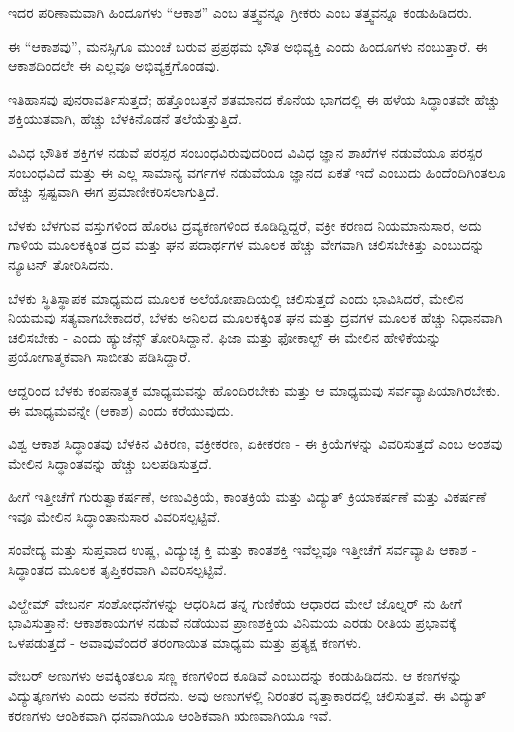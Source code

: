 ಇದರ ಪರಿಣಾಮವಾಗಿ ಹಿಂದೂಗಳು “ಆಕಾಶ” ಎಂಬ ತತ್ತ್ವವನ್ನೂ ಗ್ರೀಕರು  ಎಂಬ ತತ್ತ್ವವನ್ನೂ ಕಂಡುಹಿಡಿದರು.

ಈ “ಆಕಾಶವು”, ಮನಸ್ಸಿಗೂ ಮುಂಚೆ ಬರುವ ಪ್ರಪ್ರಥಮ ಭೌತ ಅಭಿವ್ಯಕ್ತಿ ಎಂದು ಹಿಂದೂಗಳು ನಂಬುತ್ತಾರೆ. ಈ ಆಕಾಶದಿಂದಲೇ ಈ ಎಲ್ಲವೂ ಅಭಿವ್ಯಕ್ತಗೊಂಡವು.

ಇತಿಹಾಸವು ಪುನರಾವರ್ತಿಸುತ್ತದೆ; ಹತ್ತೊಂಬತ್ತನೆ ಶತಮಾನದ ಕೊನೆಯ ಭಾಗದಲ್ಲಿ ಈ ಹಳೆಯ ಸಿದ್ಧಾಂತವೇ ಹೆಚ್ಚು ಶಕ್ತಿಯುತವಾಗಿ, ಹೆಚ್ಚು ಬೆಳಕಿನೊಡನೆ ತಲೆಯೆತ್ತುತ್ತಿದೆ.

ವಿವಿಧ ಭೌತಿಕ ಶಕ್ತಿಗಳ ನಡುವೆ ಪರಸ್ಪರ ಸಂಬಂಧವಿರುವುದರಿಂದ ವಿವಿಧ ಜ್ಞಾನ ಶಾಖೆಗಳ ನಡುವೆಯೂ ಪರಸ್ಪರ ಸಂಬಂಧವಿದೆ ಮತ್ತು ಈ ಎಲ್ಲ ಸಾಮಾನ್ಯ ವರ್ಗಗಳ ನಡುವೆಯೂ ಜ್ಞಾನದ ಏಕತೆ ಇದೆ ಎಂಬುದು ಹಿಂದೆಂದಿಗಿಂತಲೂ ಹೆಚ್ಚು ಸ್ಪಷ್ಟವಾಗಿ ಈಗ ಪ್ರಮಾಣೀಕರಿಸಲಾಗುತ್ತಿದೆ.

ಬೆಳಕು ಬೆಳಗುವ ವಸ್ತುಗಳಿಂದ ಹೊರಟ ದ್ರವ್ಯಕಣಗಳಿಂದ ಕೂಡಿದ್ದಿದ್ದರೆ, ವಕ್ರೀ ಕರಣದ ನಿಯಮಾನುಸಾರ, ಅದು ಗಾಳಿಯ ಮೂಲಕಕ್ಕಿಂತ ದ್ರವ ಮತ್ತು ಘನ ಪದಾರ್ಥಗಳ ಮೂಲಕ ಹೆಚ್ಚು ವೇಗವಾಗಿ ಚಲಿಸಬೇಕಿತ್ತು ಎಂಬುದನ್ನು ನ್ಯೂಟನ್ ತೋರಿಸಿದನು.

ಬೆಳಕು ಸ್ಥಿತಿಸ್ಥಾಪಕ ಮಾಧ್ಯಮದ ಮೂಲಕ ಅಲೆಯೋಪಾದಿಯಲ್ಲಿ ಚಲಿಸುತ್ತದೆ ಎಂದು ಭಾವಿಸಿದರೆ, ಮೇಲಿನ ನಿಯಮವು ಸತ್ಯವಾಗಬೇಕಾದರೆ, ಬೆಳಕು ಅನಿಲದ ಮೂಲಕಕ್ಕಿಂತ ಘನ ಮತ್ತು ದ್ರವಗಳ ಮೂಲಕ ಹೆಚ್ಚು ನಿಧಾನವಾಗಿ ಚಲಿಸಬೇಕು - ಎಂದು ಹ್ಯುಜೆನ್ಸ್  ತೋರಿಸಿದ್ದಾನೆ. ಫಿಜಾ  ಮತ್ತು ಫೋಕಾಲ್ಟ್  ಈ ಮೇಲಿನ ಹೇಳಿಕೆಯನ್ನು ಪ್ರಯೋಗಾತ್ಮಕವಾಗಿ ಸಾಬೀತು ಪಡಿಸಿದ್ದಾರೆ.

ಆದ್ದರಿಂದ ಬೆಳಕು ಕಂಪನಾತ್ಮಕ ಮಾಧ್ಯಮವನ್ನು ಹೊಂದಿರಬೇಕು ಮತ್ತು ಆ ಮಾಧ್ಯಮವು ಸರ್ವವ್ಯಾಪಿಯಾಗಿರಬೇಕು. ಈ ಮಾಧ್ಯಮವನ್ನೇ  (ಆಕಾಶ) ಎಂದು ಕರೆಯುವುದು.

ವಿಶ್ವ ಆಕಾಶ ಸಿದ್ಧಾಂತವು ಬೆಳಕಿನ ವಿಕಿರಣ, ವಕ್ರೀಕರಣ, ಏಕೀಕರಣ - ಈ ಕ್ರಿಯೆಗಳನ್ನು ವಿವರಿಸುತ್ತದೆ ಎಂಬ ಅಂಶವು ಮೇಲಿನ ಸಿದ್ಧಾಂತವನ್ನು ಹೆಚ್ಚು ಬಲಪಡಿಸುತ್ತದೆ.

ಹೀಗೆ ಇತ್ತೀಚೆಗೆ ಗುರುತ್ವಾಕರ್ಷಣೆ, ಅಣುವಿಕ್ರಿಯೆ, ಕಾಂತಕ್ರಿಯೆ ಮತ್ತು ವಿದ್ಯುತ್ ಕ್ರಿಯಾಕರ್ಷಣೆ ಮತ್ತು ವಿಕರ್ಷಣೆ ಇವೂ ಮೇಲಿನ ಸಿದ್ಧಾಂತಾನುಸಾರ ವಿವರಿಸಲ್ಪಟ್ಟಿವೆ.

ಸಂವೇದ್ಯ ಮತ್ತು ಸುಪ್ತವಾದ ಉಷ್ಣ, ವಿದ್ಯುಚ್ಛ ಕ್ತಿ ಮತ್ತು ಕಾಂತಶಕ್ತಿ ಇವೆಲ್ಲವೂ ಇತ್ತೀಚೆಗೆ ಸರ್ವವ್ಯಾಪಿ ಆಕಾಶ - ಸಿದ್ಧಾಂತದ ಮೂಲಕ ತೃಪ್ತಿಕರವಾಗಿ ವಿವರಿಸಲ್ಪಟ್ಟಿವೆ.

ವಿಲ್ಹೇಮ್​ ವೇಬರ್ನ ಸಂಶೋಧನೆಗಳನ್ನು ಆಧರಿಸಿದ ತನ್ನ ಗುಣಿಕೆಯ ಆಧಾರದ ಮೇಲೆ ಜೊಲ್ನರ್  ನು ಹೀಗೆ ಭಾವಿಸುತ್ತಾನೆ: ಆಕಾಶಕಾಯಗಳ ನಡುವೆ ನಡೆಯುವ ಪ್ರಾಣಶಕ್ತಿಯ ವಿನಿಮಯ ಎರಡು ರೀತಿಯ ಪ್ರಭಾವಕ್ಕೆ ಒಳಪಡುತ್ತದೆ - ಅವಾವುವೆಂದರೆ ತರಂಗಾಯಿತ ಮಾಧ್ಯಮ ಮತ್ತು ಪ್ರತ್ಯಕ್ಷ ಕಣಗಳು.

ವೇಬರ್ ಅಣುಗಳು  ಅವಕ್ಕಿಂತಲೂ ಸಣ್ಣ ಕಣಗಳಿಂದ ಕೂಡಿವೆ ಎಂಬುದನ್ನು ಕಂಡುಹಿಡಿದನು. ಆ ಕಣಗಳನ್ನು ವಿದ್ಯುತ್ಕಣಗಳು ಎಂದು ಅವನು ಕರೆದನು. ಅವು ಅಣುಗಳಲ್ಲಿ ನಿರಂತರ ವೃತ್ತಾಕಾರದಲ್ಲಿ ಚಲಿಸುತ್ತವೆ. ಈ ವಿದ್ಯುತ್ ಕರಣಗಳು ಆಂಶಿಕವಾಗಿ ಧನವಾಗಿಯೂ ಆಂಶಿಕವಾಗಿ ಋಣವಾಗಿಯೂ ಇವೆ.

